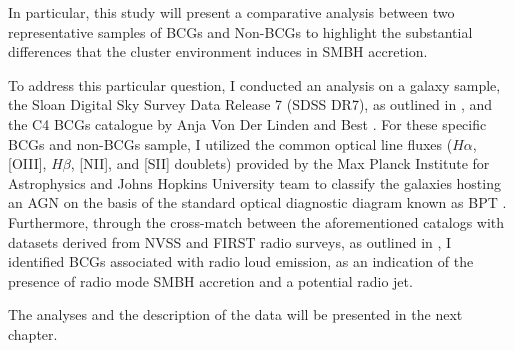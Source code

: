 In particular, this study will present a comparative analysis between two representative samples of BCGs and Non-BCGs to highlight the substantial differences that the cluster environment induces in SMBH accretion.


To address this particular question, I conducted an analysis on a galaxy sample, the Sloan Digital Sky Survey Data Release 7 (SDSS DR7), as outlined in \cite{2009ApJS..182..543A}, and the C4 BCGs catalogue by Anja Von Der Linden and Best \cite{2007MNRAS.379..867V}. For these specific BCGs and non-BCGs sample, I utilized the common optical line fluxes ($H\alpha$, [OIII], $H\beta$, [NII], and [SII] doublets) provided by the Max Planck Institute for Astrophysics and Johns Hopkins University team to classify the galaxies hosting an AGN on the basis of the standard optical diagnostic diagram known as BPT \cite{1981PASP...93....5B}. Furthermore, through the cross-match between the aforementioned catalogs with datasets derived from NVSS and FIRST radio surveys, as outlined in \cite{2005MNRAS.362....9B}, I identified BCGs associated with radio loud emission, as an indication of the presence of radio mode SMBH accretion and a potential radio jet.

The analyses and the description of the data will be presented in the next chapter. 

